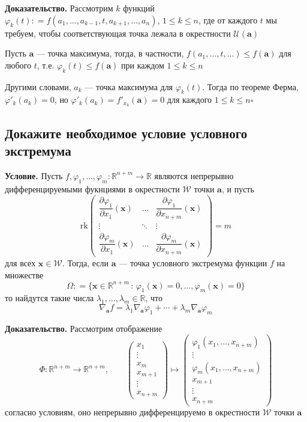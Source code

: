 \documentclass[a4paper]{article}
\newcommand{\qed}{\hfill$\square$}
\newcommand{\m}[1]{\mathbf{#1}}
\begin{document}
\textbf{Доказательство.} Рассмотрим $k$ функций $\varphi_k(t): = f(a_1,\ldots, a_{k-1}, t, a_{k+1}, \ldots, a_n)$, $1 \le k \le n$, где от каждого $t$ мы требуем, чтобы соответствующая точка лежала в окрестности $\mathscr{U}(\m{a})$

Пусть $\m{a}$ — точка максимума, тогда, в частности, $f(a_1, \ldots, t, \ldots) \le f(\m{a})$ для любого $t$, т.е. $\varphi_k(t) \le f(\m{a})$ при каждом $1 \le k \le n$

Другими словами, $a_k$ — точка максимума для $\varphi_k(t)$. Тогда по теореме Ферма, $\varphi'_k(a_k) = 0$, но $\varphi'_k(a_k) = f'_{x_k}(\m{a}) = 0$ для каждого $1 \le k \le n$\qed

\subsection{Докажите необходимое условие условного экстремума}
\textbf{Условие.} Пусть $f, \varphi_1,\ldots, \varphi_m: \mathbb{R}^{n+m} \to \mathbb{R}$ являются непрерывно дифференцируемыми фукнциями в окрестности $\mathscr{W}$ точки $\m{a}$, и пусть 
$$
\mathrm{rk} \begin{pmatrix}
\dfrac{\partial \varphi_1}{\partial x_1} (\m{x}) & \ldots & \dfrac{\partial \varphi_1}{\partial x_{n+m}} (\m{x}) \\
\vdots & \ddots & \vdots \\
\dfrac{\partial \varphi_m}{\partial x_1} (\m{x}) & \ldots & \dfrac{\partial \varphi_m}{\partial x_{n+m}} (\m{x})
\end{pmatrix} = m
$$
для всех $\m{x}\in \mathscr{W}$. Тогда, если $\m{a}$ — точка условного экстремума функции $f$ на множестве
$$
\Omega: = \{\m{x} \in \mathbb{R}^{n+m}\,:\, \varphi_1(\m{x}) =0, \ldots, \varphi_m(\m{x}) = 0\}
$$
то найдутся такие числа $\lambda_1,\ldots, \lambda_m \in \mathbb{R}$, что
$$
\nabla_\m{a} f = \lambda_1 \nabla_\m{a} \varphi_1 + \cdots +   \lambda_m \nabla_\m{a} \varphi_m
$$

\textbf{Доказательство.} Рассмотрим отображение
$$
\Phi: \mathbb{R}^{n+m} \to \mathbb{R}^{n+m}, \qquad \begin{pmatrix}
x_1 \\ \vdots \\ x_m \\ x_{m+1} \\ \vdots \\ x_{n+m}
\end{pmatrix} \mapsto \begin{pmatrix}
\varphi_1(x_1,\ldots, x_{n+m}) \\
\vdots \\
\varphi_m(x_1,\ldots, x_{n+m}) \\
x_{m+1} \\ \vdots \\x_{n+m}
\end{pmatrix}
$$
согласно условиям, оно непрерывно дифференцируемо в окрестности $\mathscr{W}$ точки $\m{a}$
\end{document}
